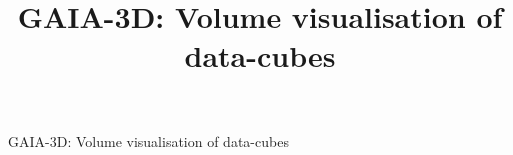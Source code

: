 \documentclass[11pt,twoside]{article}  %
\begin{document}

%
%


%

\title{GAIA-3D: Volume visualisation of data-cubes}

%
%
%
%
%

         {GAIA-3D: Volume visualisation of data-cubes}
\end{document}
